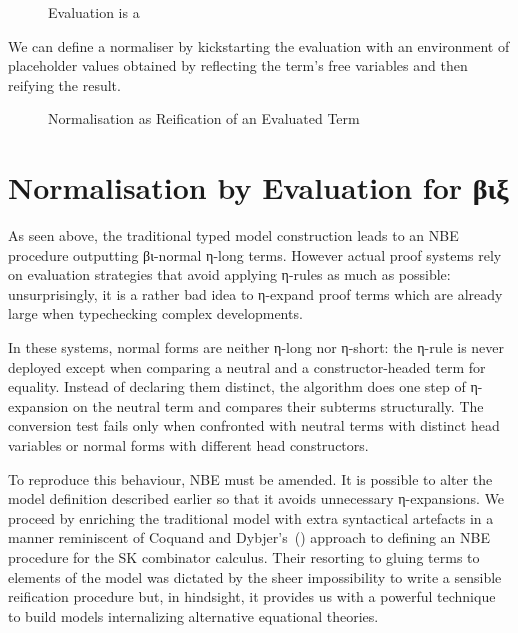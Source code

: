 \begin{figure}[h]
\caption{Evaluation is a \label{fig:evalnbe}}
\end{figure}

We can define a normaliser by kickstarting the evaluation with an environment of
placeholder values obtained by reflecting the term's free variables and then reifying
the result.

\begin{figure}[h]
\caption{Normalisation as Reification of an Evaluated Term\label{fig:normnbe}}
\end{figure}

\section{Normalisation by Evaluation for βιξ}

As seen above, the traditional typed model construction leads to an NBE
procedure outputting βι-normal η-long terms. However actual proof systems
rely on evaluation strategies that avoid applying η-rules
as much as possible: unsurprisingly, it is a rather bad idea to η-expand proof
terms which are already large when typechecking complex developments.

In these systems, normal forms are neither η-long nor η-short: the η-rule is
never deployed except when comparing a neutral and a constructor-headed term
for equality. Instead of declaring
them distinct, the algorithm does one step of η-expansion on the
neutral term and compares their subterms structurally. The conversion test
fails only when confronted with neutral terms with distinct head
variables or normal forms with different head constructors.

To reproduce this behaviour, NBE must be amended.
It is possible to alter the model definition described earlier so that it
avoids unnecessary η-expansions. We proceed by enriching the traditional
model with extra syntactical artefacts in a manner reminiscent of Coquand
and Dybjer's~(\citeyear{CoqDybSK}) approach to defining an NBE procedure for the SK combinator calculus. Their resorting to gluing
terms to elements of the model was dictated by the sheer impossibility to write
a sensible reification procedure but, in hindsight, it provides us with a
powerful technique to build models internalizing alternative equational
theories.

